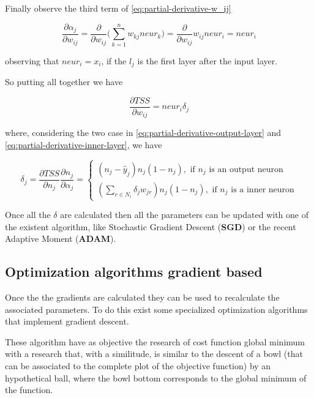 Finally observe the third term of \ref{eq:partial-derivative-w_ij}
\begin{center}
	\begin{equation}
		\frac{\partial{\alpha_j}}{\partial{w_{ij}}} = \frac{\partial{}}{\partial{w_{ij}}}\Bigg(\sum\limits_{k=1}^n w_{kj}neur_k\Bigg) = \frac{\partial{}}{\partial{w_{ij}}}w_{ij}neur_i = neur_i
	\end{equation}
\end{center}
observing that $neur_i = x_i$, if the $l_j$ is the first layer after the input layer.

So putting all together we have 
\begin{center}
	\begin{equation}
		\frac{\partial{TSS}}{\partial{w_{ij}}} = neur_i\delta_j
	\end{equation}
\end{center}
where, considering the two case in \ref{eq:partial-derivative-output-layer} and \ref{eq:partial-derivative-inner-layer}, we have
\begin{center}
	\begin{equation}
		\delta_j = \frac{\partial{TSS}}{\partial{n_j}}\frac{\partial{n_j}}{\partial{\alpha_j}} = \left.
		\begin{cases}
			(n_j - \hat{y}_j)n_j(1 - n_j),\textrm{ if } n_j \textrm{ is an output neuron} \\
(\sum\limits_{r	\in N_i}\delta_{j}w_{jr})n_{j}(1 - n_{j}), \textrm{ if }n_j\textrm{ is a inner neuron}
		\end{cases}\right.
	\end{equation}
\end{center} 

Once all the $\delta$ are calculated then all the parameters can be updated with one of the existent algorithm, like Stochastic Gradient Descent (\textbf{SGD}) or the recent Adaptive Moment (\textbf{ADAM}).


\subsection{Optimization algorithms gradient based}
Once the the gradients are calculated they can be used to recalculate the associated parameters. To do this exist some specialized optimization algorithms that implement gradient descent.

These algorithm have as objective the research of cost function global minimum with a research that, with a similitude, is similar to the descent of a bowl (that can be associated to the complete plot of the objective function) by an hypothetical ball, where the bowl bottom corresponds to the global minimum of the function.


